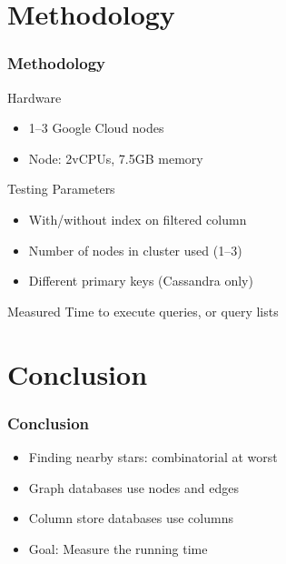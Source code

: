\documentclass[11pt]{beamer}
\begin{document}
    \section{Methodology}\label{sec:methodology}
    \begin{frame}
        \frametitle{Methodology}
        \begin{block}{Hardware}
            \begin{itemize}
                \item 1--3 Google Cloud nodes \smallskip
                \item Node: 2vCPUs, 7.5GB memory \smallskip
            \end{itemize}
        \end{block}
        \begin{block}{Testing Parameters}
            \begin{itemize}
                \item With/without index on filtered column \smallskip
                \item Number of nodes in cluster used (1--3) \smallskip
                \item Different primary keys (Cassandra only) \smallskip
            \end{itemize}
        \end{block}
        \begin{block}{Measured}
            Time to execute queries, or query lists
        \end{block}
    \end{frame}

    \section{Conclusion}\label{sec:conclusion}
    \begin{frame}
        \frametitle{Conclusion}
        \begin{itemize}
            \item Finding nearby stars: combinatorial at worst \bigskip
            \item Graph databases use nodes and edges \bigskip
            \item Column store databases use columns \bigskip
            \item Goal: Measure the running time
        \end{itemize}
    \end{frame}

    \begin{frame}
    \end{frame}
\end{document}
